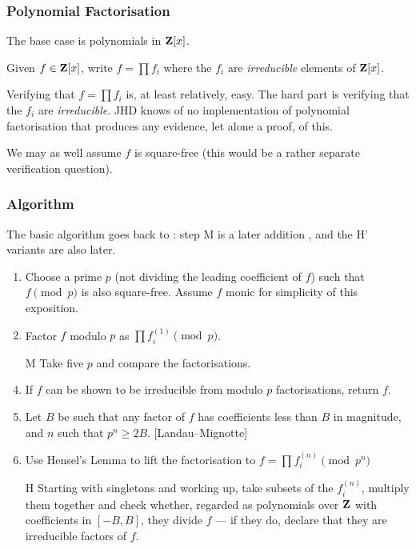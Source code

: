 \documentclass[handout]{beamer}   %
\begin{document}
\begin{frame}[fragile]
\frametitle{Polynomial Factorisation}
The base case is polynomials in ${\bf Z}[x]$. 
\begin{problem}[Factorisation]\label{prob:fact}
Given $f\in{\bf Z}[x]$, write $f=\prod f_i$ where the $f_i$ are \emph{irreducible} elements of ${\bf Z}[x]$.
\end{problem}
\pause Verifying that $f=\prod f_i$ is, at least relatively, easy. \pause The hard part is verifying that the $f_i$ are \emph{irreducible}. \pause JHD knows of no implementation of polynomial factorisation that produces any evidence, let alone a proof, of this.
\iffalse
\pause
\begin{problem}[Factorisation in this style]\label{prob:fact-basic}
Given $f\in\Z[x_1,\ldots,x_n]$, produce
        \begin{description}
                \item[either]a proper factor $g$ of $f$,
\item[or]$\bottom$ indicating that no such $g$ exists.
        \end{description}
\end{problem}
\fi
\pause\par
We may as well assume $f$ is square-free \pause(this would be a rather separate verification question).
\end{frame}
\begin{frame}[fragile]
\frametitle{Algorithm}
The basic algorithm goes back to \cite{Zassenhaus1969}: step M is a later addition \cite{Musser1975a}, and the  H' variants are also later.\pause
\begin{enumerate}[<+->]
\item Choose a prime $p$ (not dividing the leading coefficient of $f$) such that $f\pmod p$ is also square-free. Assume $f$ monic for simplicity of this exposition.
\item\label{step:p} Factor $f$ modulo $p$ as $\prod f_i^{(1)} \pmod p$.
\item[M]Take five $p$ and compare the factorisations.
\item If $f$ can be shown to be irreducible from modulo $p$ factorisations, return $f$.
\item Let $B$ be such that any factor of $f$ has coefficients less than $B$ in magnitude, and $n$ such that $p^n\ge 2B$. [Landau--Mignotte]
\item Use Hensel's Lemma to lift the factorisation to $f=\prod f_i^{(n)} \pmod {p^n}$
\item[H]\label{step:H} Starting with singletons and working up, take subsets of the $f_i^{(n)}$, multiply them together and check whether, regarded as polynomials over ${\bf Z}$ with coefficients in $[-B,B]$, they {\color{red}divide} $f$ --- if they do, declare that they are irreducible factors of $f$.
\end{enumerate}
\end{frame}
\end{document}
